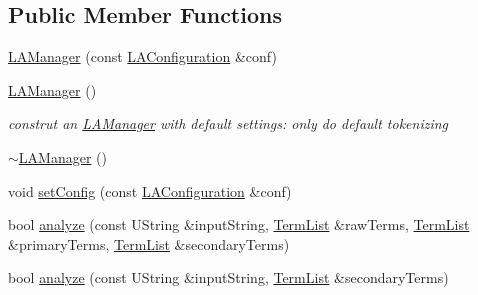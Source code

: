 \subsection*{Public Member Functions}
\begin{CompactItemize}
\item 
\hyperlink{classla__manager_1_1LAManager_7066f276279b4dd2cdca28f43d69658c}{LAManager} (const \hyperlink{classla__manager_1_1LAConfiguration}{LAConfiguration} \&conf)
\item 
\hyperlink{classla__manager_1_1LAManager_f941e0e7868031624407c8311443864e}{LAManager} ()
\begin{CompactList}\small\item\em construt an \hyperlink{classla__manager_1_1LAManager}{LAManager} with default settings: only do default tokenizing \item\end{CompactList}\item 
\hyperlink{classla__manager_1_1LAManager_d2b2cc43d34abae382c2efb451bc86ae}{$\sim$LAManager} ()
\item 
void \hyperlink{classla__manager_1_1LAManager_2904779650c22fe381b436ab2d23e13a}{setConfig} (const \hyperlink{classla__manager_1_1LAConfiguration}{LAConfiguration} \&conf)
\item 
bool \hyperlink{classla__manager_1_1LAManager_3fc44ac17a38ba0e63e677df9798d114}{analyze} (const UString \&inputString, \hyperlink{namespacela__manager_06c0aab93982ee3ebc3ef9d0419e619a}{TermList} \&rawTerms, \hyperlink{namespacela__manager_06c0aab93982ee3ebc3ef9d0419e619a}{TermList} \&primaryTerms, \hyperlink{namespacela__manager_06c0aab93982ee3ebc3ef9d0419e619a}{TermList} \&secondaryTerms)
\item 
bool \hyperlink{classla__manager_1_1LAManager_1293ab3f57e2b05e1d062031c76444ad}{analyze} (const UString \&inputString, \hyperlink{namespacela__manager_06c0aab93982ee3ebc3ef9d0419e619a}{TermList} \&secondaryTerms)
\end{CompactItemize}
